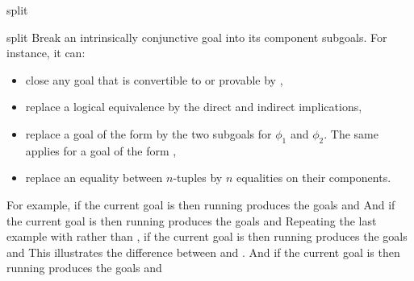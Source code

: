 \begin{tactic}{split}
  \begin{tsyntax}[empty]{split}
  Break an intrinsically conjunctive goal into its component subgoals.
  For instance, it can:
  \begin{itemize}
  \item close any goal that is convertible to  or provable by
    ,
    \item replace a logical equivalence by the direct and indirect implications,
    \item replace a goal of the form  by the two
      subgoals for $\phi_1$ and $\phi_2$. The same applies for a goal of
      the form ,
    \item replace an equality between $n$-tuples by $n$ equalities
          on their components.
  \end{itemize}

  For example, if the current goal is
   then
  running 
  produces the goals
  and
  And if the current goal is
   then
  running 
  produces the goals
  and
  Repeating the last example with \ec{&&} rather than \ec{/\\},
  if the current goal is
   then
  running 
  produces the goals
  and
  This illustrates the difference between \ec{/\\} and \ec{&&}.
  And if the current goal is
   then
  running 
  produces the goals
  and
  \end{tsyntax}
\end{tactic}
